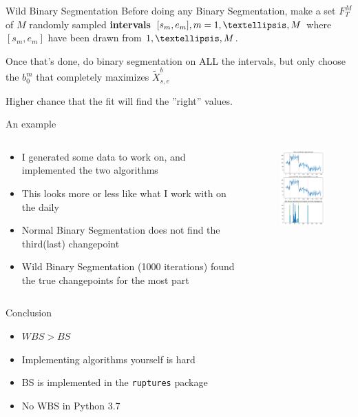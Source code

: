 \documentclass[10pt]{beamer}
\begin{document}
\begin{frame}[t]{Wild Binary Segmentation}
Before doing any Binary Segmentation, make a set \(F_T^M\) of $M$ randomly sampled \textbf{intervals} $[s_m,e_m], m=1,\textellipsis,M$ where $[s_m,e_m]$ have been drawn from ${1,\textellipsis, M}$.

Once that's done, do binary segmentation on ALL the intervals, but only choose the \(b_0^m\) that completely maximizes \(\tilde{X}^{b}_{s,e}\)

Higher chance that the fit will find the ''right'' values.
\end{frame}

\begin{frame}[t]{An example}
\begin{columns}
\begin{column}[T]{0.55\textwidth}
\begin{itemize}
  \item I generated some data to work on, and implemented the two algorithms
  \item This looks more or less like what I work with on the daily
  \item Normal Binary Segmentation does not find the third(last) changepoint
  \item Wild Binary Segmentation (1000 iterations) found the true changepoints for the most part
\end{itemize}
\end{column}
\hfill
\begin{column}[T]{0.45\textwidth}
  \begin{figure}
    \includegraphics[width = 4.5cm]{../wsb_figures/simulation.png}
  \end{figure}
\end{column}
\end{columns}

\end{frame}

\begin{frame}[t]{Conclusion}
\begin{itemize}
  \item \(WBS > BS \)
  \item Implementing algorithms yourself is hard
  \item BS is implemented in the \texttt{ruptures} package
  \item No WBS in Python 3.7
\end{itemize}

\end{frame}
\end{document}
